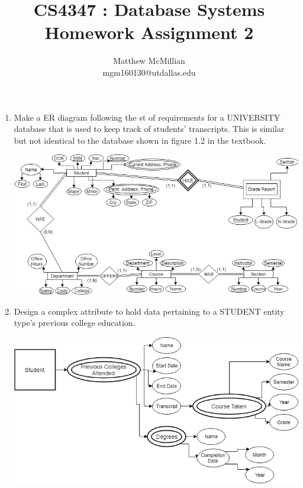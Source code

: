 \documentclass[12pt]{article}
\begin{document}
\title{CS4347 : Database Systems\\Homework Assignment 2}
\author{Matthew McMillian\\mgm160130@utdallas.edu}
\maketitle



\begin{enumerate}
	
	\item Make a ER diagram following the st of requirements for a UNIVERSITY database that is used to keep track of students' transcripts. This is similar but not identical to the database shown in figure 1.2 in the textbook. \\
		\begin{center}
			\includegraphics[scale=0.55]{er2}
		\end{center} 
		\pagebreak
	\item Design a complex attribute to hold data pertaining to a STUDENT entity type's previous college education. \\
	\begin{center}
			\includegraphics[scale=0.55]{attr}
		\end{center} 
	
\end{enumerate}
\end{document}
